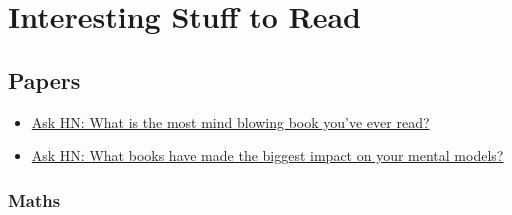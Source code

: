 \section{Interesting Stuff to Read}


\subsection{Papers}

\begin{itemize}

	\item \href{files/Ask HN_ What is the most mind blowing book you've ever read_ _ Hacker News.pdf}{Ask HN: What is the most mind blowing book you've ever read?}

	\item \href{files/Ask HN_ What books have made the biggest impact on your mental models_ _ Hacker News.pdf}{Ask HN: What books have made the biggest impact on your mental models?}

\end{itemize}
	
\subsubsection{Maths}

